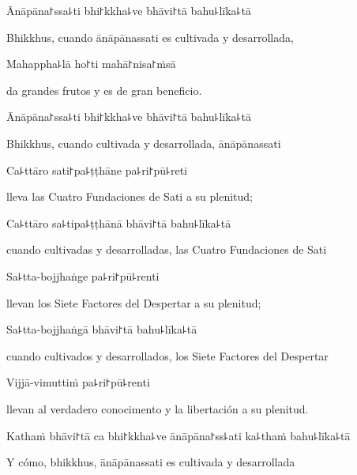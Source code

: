 Ānāpāna꜓ssa꜕ti bhi꜓kkha꜕ve bhāvi꜓tā bahu꜕līka꜕tā

\begin{english}
  Bhikkhus, cuando ānāpānassati es cultivada y desarrollada,
\end{english}

Mahappha꜕lā ho꜓ti mahā꜓nisa꜓ṁsā

\begin{english}
  da grandes frutos y es de gran beneficio.
\end{english}

Ānāpāna꜓ssa꜕ti bhi꜓kkha꜕ve bhāvi꜓tā bahu꜕līka꜕tā

\begin{english}
  Bhikkhus, cuando cultivada y desarrollada, ānāpānassati
\end{english}

Ca꜕ttāro sati꜓pa꜕ṭṭhāne pa꜕ri꜓pū꜕reti

\begin{english}
  lleva las Cuatro Fundaciones de Sati a su plenitud;
\end{english}

Ca꜕ttāro sa꜕tipa꜕ṭṭhānā bhāvi꜓tā bahu꜕līka꜕tā

\begin{english}
  cuando cultivadas y desarrolladas, las Cuatro Fundaciones de Sati
\end{english}

Sa꜕tta-bojjhaṅge pa꜕ri꜓pū꜕renti

\begin{english}
  llevan los Siete Factores del Despertar a su plenitud;
\end{english}

Sa꜕tta-bojjhaṅgā bhāvi꜓tā bahu꜕līka꜕tā

\begin{english}
  cuando cultivados y desarrollados, los Siete Factores del Despertar
\end{english}

\enlargethispage{\baselineskip}

Vijjā-vimuttiṁ pa꜕ri꜓pū꜕renti

\begin{english}
  llevan al verdadero conocimento y la libertación a su plenitud.
\end{english}

Kathaṁ bhāvi꜓tā ca bhi꜓kkha꜕ve ānāpāna꜓ss꜕ati ka꜕thaṁ bahu꜕līka꜕tā

\begin{english}
  Y cómo, bhikkhus, ānāpānassati es cultivada y desarrollada
\end{english}

